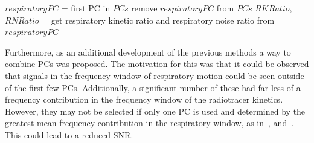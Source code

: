                     \begin{algorithm}
                        \caption{Combining \glspl{PC}}
                        \;
                        $respiratoryPC$ = first \gls{PC} in $PCs$\;
                        remove $respiratoryPC$ from $PCs$\;
                        $RKRatio$, $RNRatio$ = get respiratory kinetic ratio and respiratory noise ratio from $respiratoryPC$\;
                        \;
                    \end{algorithm} \label{eq:pca_data_driven_surrogate_signal_extraction_methods_for_dynamic_pet_methods_combining_pcs_pseudo_code}
                    
                    Furthermore, as an additional development of the previous methods a way to combine \glspl{PC} was proposed. The motivation for this was that it could be observed that signals in the frequency window of respiratory motion could be seen outside of the first few \glspl{PC}. Additionally, a significant number of these had far less of a frequency contribution in the frequency window of the radiotracer kinetics. However, they may not be selected if only one \gls{PC} is used and determined by the greatest mean frequency contribution in the respiratory window, as in~\parencite{Thielemans2011}, and~\parencite{Bertolli2018Data-DrivenTomography}. This could lead to a reduced \gls{SNR}.
                    
